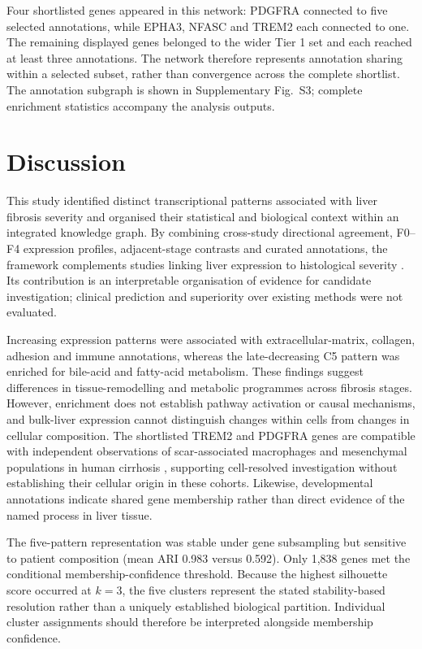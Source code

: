 \documentclass[11pt,a4paper]{article}
\begin{document}
Four shortlisted genes appeared in this network: PDGFRA connected to five selected annotations, while EPHA3, NFASC and TREM2 each connected to one. The remaining displayed genes belonged to the wider Tier 1 set and each reached at least three annotations. The network therefore represents annotation sharing within a selected subset, rather than convergence across the complete shortlist. The annotation subgraph is shown in Supplementary Fig.~S3; complete enrichment statistics accompany the analysis outputs.





\section*{Discussion}
This study identified distinct transcriptional patterns associated with liver fibrosis severity and organised their statistical and biological context within an integrated knowledge graph. By combining cross-study directional agreement, F0--F4 expression profiles, adjacent-stage contrasts and curated annotations, the framework complements studies linking liver expression to histological severity \cite{ref4}. Its contribution is an interpretable organisation of evidence for candidate investigation; clinical prediction and superiority over existing methods were not evaluated.

Increasing expression patterns were associated with extracellular-matrix, collagen, adhesion and immune annotations, whereas the late-decreasing C5 pattern was enriched for bile-acid and fatty-acid metabolism. These findings suggest differences in tissue-remodelling and metabolic programmes across fibrosis stages. However, enrichment does not establish pathway activation or causal mechanisms, and bulk-liver expression cannot distinguish changes within cells from changes in cellular composition. The shortlisted TREM2 and PDGFRA genes are compatible with independent observations of scar-associated macrophages and mesenchymal populations in human cirrhosis \cite{ref7}, supporting cell-resolved investigation without establishing their cellular origin in these cohorts. Likewise, developmental annotations indicate shared gene membership rather than direct evidence of the named process in liver tissue.

The five-pattern representation was stable under gene subsampling but sensitive to patient composition (mean ARI 0.983 versus 0.592). Only 1,838 genes met the conditional membership-confidence threshold. Because the highest silhouette score occurred at $k=3$, the five clusters represent the stated stability-based resolution rather than a uniquely established biological partition. Individual cluster assignments should therefore be interpreted alongside membership confidence.
\end{document}

